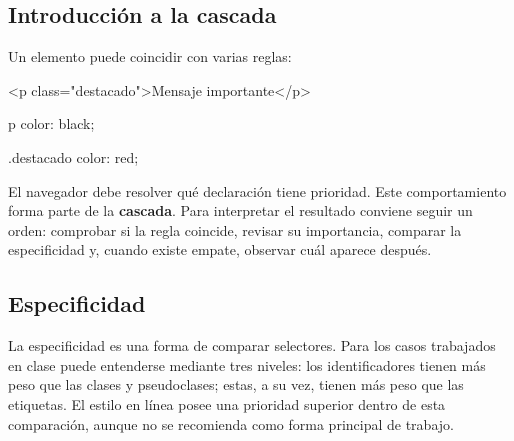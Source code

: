 \documentclass[11pt]{article}
\begin{document}

    \subsection{Introducción a la cascada}

    Un elemento puede coincidir con varias reglas:

    \begin{htmlcodedark}
        <p class="destacado">Mensaje importante</p>
    \end{htmlcodedark}

    \begin{csscodedark}
        p {
            color: black;
        }

        .destacado {
            color: red;
        }
    \end{csscodedark}

    El navegador debe resolver qué declaración tiene prioridad. Este comportamiento
    forma parte de la \textbf{cascada}. Para interpretar el resultado conviene seguir
    un orden: comprobar si la regla coincide, revisar su importancia, comparar la
    especificidad y, cuando existe empate, observar cuál aparece después.

    \subsection{Especificidad}

    La especificidad es una forma de comparar selectores. Para los casos trabajados
    en clase puede entenderse mediante tres niveles: los identificadores tienen más
    peso que las clases y pseudoclases; estas, a su vez, tienen más peso que las
    etiquetas. El estilo en línea posee una prioridad superior dentro de esta
    comparación, aunque no se recomienda como forma principal de trabajo.

    \begin{center}
    \end{center}
\end{document}
